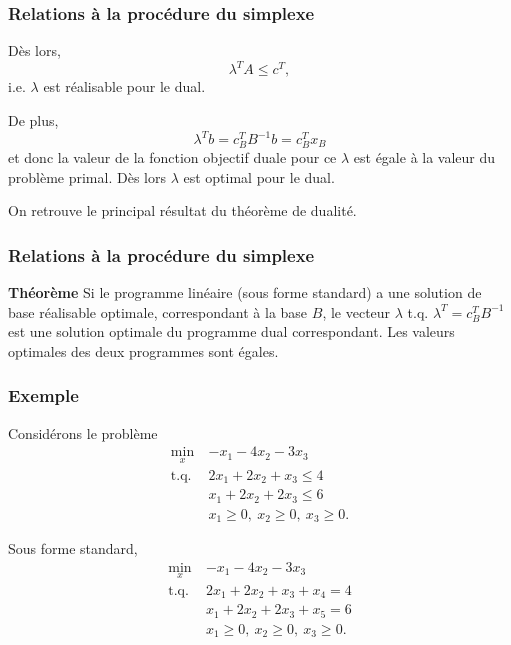 \documentclass[usepdftitle=false]{beamer}
\begin{document}
\begin{frame}
\frametitle{Relations à la procédure du simplexe}

Dès lors,
\[
\lambda^T A \leq c^T,
\]
i.e. $\lambda$ est réalisable pour le dual.

\mbox{}

De plus,
\[
\lambda^T b = c_B^T B^{-1}b = c_B^T x_B
\]
et donc la valeur de la fonction objectif duale pour ce $\lambda$ est égale à la valeur du problème primal. Dès lors $\lambda$ est optimal pour le dual.

\mbox{}

On retrouve le principal résultat du théorème de dualité.

\end{frame}

\begin{frame}
\frametitle{Relations à la procédure du simplexe}

{\bf Théorème}
Si le programme linéaire (sous forme standard) a une solution de base réalisable optimale, correspondant à la base $B$, le vecteur $\lambda$ t.q. $\lambda^T = c_B^T B^{-1}$ est une solution optimale du programme dual correspondant.
Les valeurs optimales des deux programmes sont égales.

\end{frame}

\begin{frame}
\frametitle{Exemple}

Considérons le problème
\begin{align*}
\min_x \ & -x_1 - 4x_2 -3x_3 \\
\mbox{t.q. } & 2x_1 + 2x_2 + x_3 \leq 4 \\
& x_1 + 2x_2 + 2x_3 \leq 6 \\
& x_1 \geq 0,\ x_2 \geq 0,\ x_3 \geq 0.
\end{align*}

\mbox{}

Sous forme standard,
\begin{align*}
\min_x \ & -x_1 - 4x_2 -3x_3 \\
\mbox{t.q. } & 2x_1 + 2x_2 + x_3 + x_4 = 4 \\
& x_1 + 2x_2 + 2x_3 + x_5 = 6 \\
& x_1 \geq 0,\ x_2 \geq 0,\ x_3 \geq 0.
\end{align*}

\end{frame}
\end{document}
